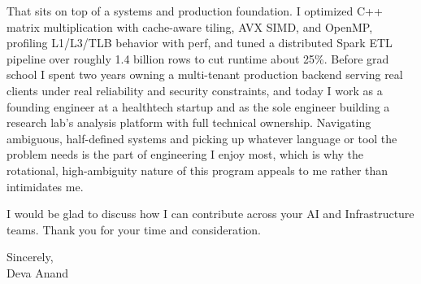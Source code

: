 \documentclass[letterpaper,11pt]{article}
\begin{document}
That sits on top of a systems and production foundation. I optimized C++ matrix multiplication with cache-aware tiling, AVX SIMD, and OpenMP, profiling L1/L3/TLB behavior with perf, and tuned a distributed Spark ETL pipeline over roughly 1.4 billion rows to cut runtime about 25\%. Before grad school I spent two years owning a multi-tenant production backend serving real clients under real reliability and security constraints, and today I work as a founding engineer at a healthtech startup and as the sole engineer building a research lab's analysis platform with full technical ownership. Navigating ambiguous, half-defined systems and picking up whatever language or tool the problem needs is the part of engineering I enjoy most, which is why the rotational, high-ambiguity nature of this program appeals to me rather than intimidates me.

I would be glad to discuss how I can contribute across your AI and Infrastructure teams. Thank you for your time and consideration.

\vspace{4pt}

\noindent Sincerely, \\
Deva Anand
\end{document}
